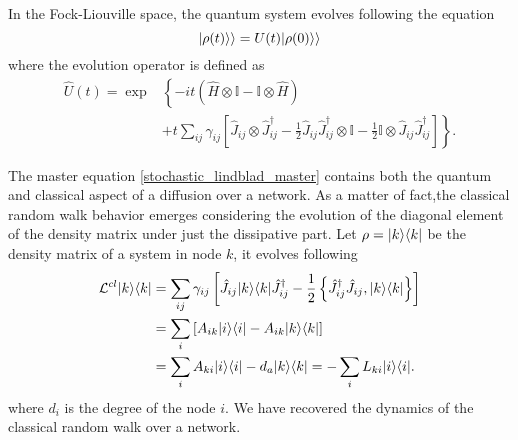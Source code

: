 In the Fock-Liouville space, the quantum system evolves following the equation
\begin{equation}
    \lvert\rho(t)\rangle\rangle  = U(t) \lvert\rho(0)\rangle\rangle
\end{equation} 
where the evolution operator is defined as \cite{Domino}
\begin{equation}
    \begin{split}
        \hat U(t) = \exp&\left\{-it\left(\hat H\otimes\mathbb{I}-\mathbb{I}\otimes\hat H\right)\right.\\
        &+\left. t\sum_{ij}\gamma_{ij}\left[ \hat J_{ij}\otimes\hat J^\dagger_{ij}-\frac{1}{2}\hat J_{ij}\hat J^\dagger_{ij}\otimes\mathbb{I}-\frac{1}{2}\mathbb{I}\otimes\hat J_{ij}\hat J^\dagger_{ij}\right]\right\}.
    \end{split}
\end{equation}



The master equation \eqref{stochastic_lindblad_master} contains both the quantum and classical aspect of a diffusion over a network. As a matter of fact,the classical random walk behavior emerges considering the evolution of the diagonal element of the density matrix under just the dissipative part. Let $\rho = \lvert k\rangle\langle k\rvert$ be the density matrix of a system in node $k$, it evolves following
\begin{equation}
    \begin{split}
        \mathcal{L}^{cl}\lvert k\rangle\langle k\rvert &= \sum_{ij}\gamma_{ij}\left[\hat J_{ij} \lvert k\rangle\langle k\rvert\hat J_{ij}^\dagger -\frac{1}{2} \left\{ \hat J_{ij}^\dagger \hat J_{ij}, \lvert k\rangle\langle k\rvert\right\}\right]\\
        &= \sum_{i}\left[A_{ik} \lvert i\rangle\langle i\rvert -A_{ik}\lvert k\rangle\langle k\rvert\right]\\
        &=\sum_{i} A_{ki} \lvert i\rangle\langle i\rvert - d_a \lvert k\rangle\langle k\rvert = -\sum_i L_{ki} \lvert i\rangle\langle i\rvert.
    \end{split}
\end{equation} 
where $d_i$ is the degree of the node $i$.
We have recovered the dynamics of the classical random walk over a network.

